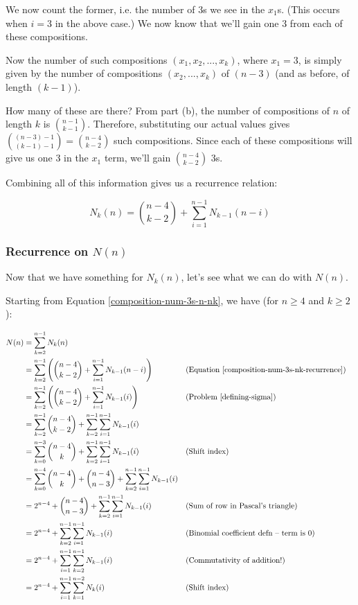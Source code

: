 We now count the former, i.e. the number of 3s we see in the $x_1$s. (This occurs when $i = 3$ in the above case.) We now know that we'll gain one 3 from each of these compositions. 

Now the number of such compositions $(x_1, x_2, ..., x_k)$, where $x_1 = 3$, is simply given by the number of compositions $(x_2, ..., x_k)$ of $(n-3)$ (and as before, of length $(k-1)$). 

How many of these are there? From part (b), the number of compositions of $n$ of length $k$ is $\binom{n-1}{k-1}$. Therefore, substituting our actual values gives $\binom{(n-3)-1}{(k-1)-1} = \binom{n-4}{k-2}$ such compositions. Since each of these compositions will give us one 3 in the $x_1$ term, we'll gain $\binom{n-4}{k-2}$ 3s.

Combining all of this information gives us a recurrence relation:

\begin{equation} 
\label{composition-num-3s-nk-recurrence}
N_k(n) = \binom{n-4}{k-2} + \sum_{i=1}^{n-1} N_{k-1}(n-i)
\end{equation}


\subsubsection{Recurrence on $N(n)$}

Now that we have something for $N_k(n)$, let's see what we can do with $N(n)$. 

Starting from Equation \ref{composition-num-3s-n-nk}, we have (for $n \geq 4$ and $k \geq 2$):

\begin{align*}
N(n) &= \sum_{k=2}^{n-1} N_k(n) \\
&= \sum_{k=2}^{n-1} \left( \binom{n-4}{k-2} + \sum_{i=1}^{n-1} N_{k-1}(n-i) \right) && \text{(Equation \ref{composition-num-3s-nk-recurrence})} \\
&= \sum_{k=2}^{n-1} \left( \binom{n-4}{k-2} + \sum_{i=1}^{n-1} N_{k-1}(i) \right) && \text{(Problem \ref{defining-sigma})} \\
&= \sum_{k=2}^{n-1} \binom{n-4}{k-2} + \sum_{k=2}^{n-1} \sum_{i=1}^{n-1} N_{k-1}(i) \\
&= \sum_{k=0}^{n-3} \binom{n-4}{k} + \sum_{k=2}^{n-1} \sum_{i=1}^{n-1} N_{k-1}(i) && \text{(Shift index)} \\
&= \sum_{k=0}^{n-4} \binom{n-4}{k} + \binom{n-4}{n-3} + \sum_{k=2}^{n-1} \sum_{i=1}^{n-1} N_{k-1}(i) \\
&= 2^{n-4} + \binom{n-4}{n-3} + \sum_{k=2}^{n-1} \sum_{i=1}^{n-1} N_{k-1}(i) && \text{(Sum of row in Pascal's triangle)} \\
&= 2^{n-4} + \sum_{k=2}^{n-1} \sum_{i=1}^{n-1} N_{k-1}(i) && \text{(Binomial coefficient defn -- term is 0)} \\
&= 2^{n-4} + \sum_{i=1}^{n-1} \sum_{k=2}^{n-1} N_{k-1}(i) && \text{(Commutativity of addition!)} \\
&= 2^{n-4} + \sum_{i=1}^{n-1} \sum_{k=1}^{n-2} N_{k}(i) && \text{(Shift index)}
\end{align*}

